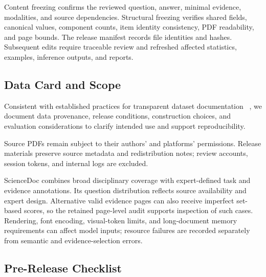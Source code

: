 \documentclass{article} %
\begin{document}
Content freezing confirms the reviewed question, answer, minimal evidence, modalities, and source dependencies. Structural freezing verifies shared fields, canonical values, component counts, item identity consistency, PDF readability, and page bounds. The release manifest records file identities and hashes. Subsequent edits require traceable review and refreshed affected statistics, examples, inference outputs, and reports.

\subsection{Data Card and Scope}
\label{app:data_card}

Consistent with established practices for transparent dataset documentation
~\cite{bender2018datastatements,gebru2021datasheets,pushkarna2022datacards},
we document data provenance, release conditions, construction choices, and
evaluation considerations to clarify intended use and support reproducibility.

Source PDFs remain subject to their authors' and platforms' permissions. Release materials preserve source metadata and redistribution notes; review accounts, session tokens, and internal logs are excluded.

ScienceDoc combines broad disciplinary coverage with expert-defined task and evidence annotations. Its question distribution reflects source availability and expert design. Alternative valid evidence pages can also receive imperfect set-based scores, so the retained page-level audit supports inspection of such cases. Rendering, font encoding, visual-token limits, and long-document memory requirements can affect model inputs; resource failures are recorded separately from semantic and evidence-selection errors.

\subsection{Pre-Release Checklist}
\label{app:pre_release}
\end{document}
